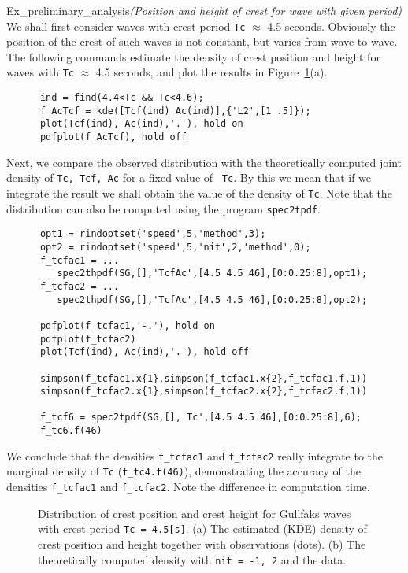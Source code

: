 \begin{cex}{Ex_preliminary_analysis}{\sl (Position and height of  
crest for wave with given period)} 
We shall first consider  waves with
crest period {\tt Tc} $\approx$ 4.5 seconds. Obviously  the position
of the crest of such waves is not constant, but varies from wave to
wave. The following commands estimate the density of crest position
and height for waves with {\tt Tc} $\approx$ 4.5 seconds, and plot the 
results in Figure~\ref{fig76}(a).
{\small\begin{verbatim}
      ind = find(4.4<Tc && Tc<4.6);
      f_AcTcf = kde([Tcf(ind) Ac(ind)],{'L2',[1 .5]});
      plot(Tcf(ind), Ac(ind),'.'), hold on
      pdfplot(f_AcTcf), hold off
\end{verbatim}
}


Next, we compare the observed distribution  with the theoretically
computed joint density of  {\tt Tc, Tcf, Ac} for a fixed value of {\tt
  Tc}. By this we mean that if we integrate the result we shall obtain
the value of the density of {\tt Tc}. Note that the distribution
 can also be computed using the program {\tt spec2tpdf}.
{\small\begin{verbatim}
      opt1 = rindoptset('speed',5,'method',3);
      opt2 = rindoptset('speed',5,'nit',2,'method',0);
      f_tcfac1 = ...
         spec2thpdf(SG,[],'TcfAc',[4.5 4.5 46],[0:0.25:8],opt1);
      f_tcfac2 = ...
         spec2thpdf(SG,[],'TcfAc',[4.5 4.5 46],[0:0.25:8],opt2);

      pdfplot(f_tcfac1,'-.'), hold on
      pdfplot(f_tcfac2)
      plot(Tcf(ind), Ac(ind),'.'), hold off

      simpson(f_tcfac1.x{1},simpson(f_tcfac1.x{2},f_tcfac1.f,1))
      simpson(f_tcfac2.x{1},simpson(f_tcfac2.x{2},f_tcfac2.f,1))

      f_tcf6 = spec2tpdf(SG,[],'Tc',[4.5 4.5 46],[0:0.25:8],6);
      f_tc6.f(46)
\end{verbatim}
}

We conclude that the densities \verb+f_tcfac1+ and
\verb+f_tcfac2+ really integrate to the marginal density  of {\tt Tc}
(\verb+f_tc4.f(46)+), demonstrating the accuracy of the
densities  \verb+f_tcfac1+ and \verb+f_tcfac2+. Note the difference in 
computation time.

\begin{figure}[htbp]
%
\hfill
{}
\vspace{-3mm}
  \caption[Estimated density of crest position and height compared
  with data]{
Distribution of crest position and crest height for Gullfaks waves with crest period
{\tt Tc = 4.5[s]}.
(a) The estimated (KDE) density of crest position and
    height together with observations (dots). (b) The theoretically
    computed density with {\tt nit = -1, 2} and the data.
}
 \label{fig76}
\end{figure}


\end{cex}
